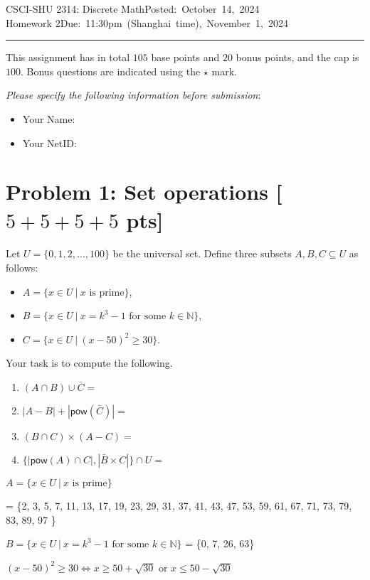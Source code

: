 \documentclass[11pt,twoside]{article}
\newcommand{\homework}[1]{
   \pagestyle{myheadings}
   \thispagestyle{plain}
   \newpage
   \setcounter{page}{1}
   \noindent
   \classname \hfill \mbox{\updatedday} \\
   \instname \hfill \mbox{\duedate}
   \rule{6.5in}{0.5mm}
   \vspace*{-0.1 in}
}
\newcommand{\problem}[1]{\section*{Problem #1}}
\def\classname{CSCI-SHU 2314: Discrete Math}
\def\updatedday{Posted: October 14, 2024}
\def\duedate{Due: 11:30pm (Shanghai time), November 1, 2024}
\def\instname{Homework 2}
\begin{document}
\homework{1}

This assignment has in total $105$ base points and $20$ bonus points, and the cap is $100$.
Bonus questions are indicated using the $\star$ mark.

\textit{Please specify the following information before submission}:
\begin{itemize}
    \item Your Name:  %
    \item Your NetID: %
\end{itemize}


\problem{1: Set operations [$5+5+5+5$ pts]} 

Let $U = \{0,1,2,\dots,100\}$ be the universal set.
Define three subsets $A,B,C \subseteq U$ as follows:
\begin{itemize}
    \item $A = \{x \in U\ |\ x \text{ is prime}\}$,
    \item $B = \{x \in U\ |\ x=k^3-1 \text{ for some } k \in \mathbb{N}\}$,
    \item $C = \{x \in U\ |\ (x-50)^2 \geq 30\}$.
\end{itemize}

Your task is to compute the following.




\begin{enumerate}
    \item $(A \cap B) \cup \bar{C} = $
    \item $|A - B| + |\mathsf{pow}(\bar{C})| = $
    \item $(B \cap C) \times (A-C) = $
    \item $\{|\mathsf{pow}(A) \cap C|, |\bar{B} \times C|\} \cap U =$
\end{enumerate}



$A = \{x \in U\ |\ x \text{ is prime}\} $

= \{2, 3, 5, 7, 11, 13, 17, 19, 23, 29, 31, 37, 41, 43, 47, 53, 59, 61, 67, 71, 73, 79, 83, 89, 97 \} 

\hspace*{\fill}

$B = \{x \in U\ |\ x=k^3-1 \text{ for some } k \in \mathbb{N}\}$ = \{0, 7, 26, 63\} 

\hspace*{\fill}

$(x-50)^2 \geq 30 \Leftrightarrow x\geq 50 + \sqrt{30}$ or $ x\leq 50-\sqrt{30} $
\end{document}
